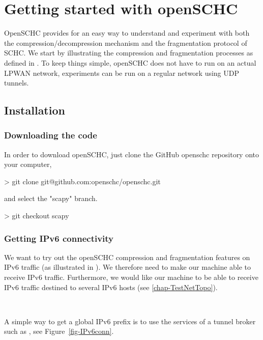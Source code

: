 \chapter{Getting started with openSCHC}

OpenSCHC provides for an easy way to understand and experiment with both the compression/decompression mechanism and the fragmentation protocol of SCHC. We start by illustrating the compression and fragmentation processes as defined in . To keep things simple, openSCHC does not have to run on an actual LPWAN network, experiments can be run on a regular network using UDP tunnels.


\section{Installation}\label{chap-plat}

\subsection{Downloading the code}

In order to download openSCHC, just clone the GitHub openschc repository onto your computer,


\begin{termc}[backgroundcolor=\color{palerod}, basicstyle=\ttfamily\small]
> git clone git@github.com:openschc/openschc.git
\end{termc}

and select the "scapy" branch.

\begin{termc}[backgroundcolor=\color{palerod}, basicstyle=\ttfamily\small, escapechar=@]
> git checkout scapy
\end{termc}

\subsection{Getting IPv6 connectivity}

We want to try out the openSCHC compression and fragmentation features on IPv6 traffic (as illustrated in ). We therefore need to make our machine able to receive IPv6 traffic. Furthermore, we would like our machine to be able to receive IPv6 traffic destined to several IPv6 hosts (see \ref{chap-TestNetTopo}).

~

A simple way to get a global IPv6 prefix is to use the services of a tunnel broker such as , see Figure~\ref{fig-IPv6conn}.

